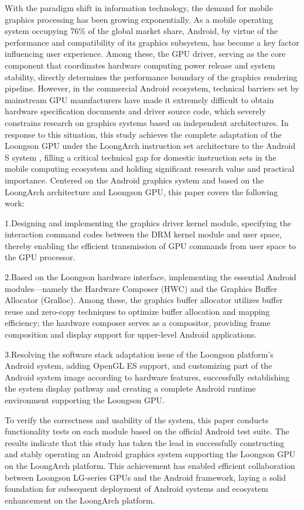 \begin{abstract*}
  With the paradigm shift in information technology, the demand for mobile graphics processing has been growing exponentially. As a mobile operating system occupying 76\% of the global market share,
  Android, by virtue of the performance and compatibility of its graphics subsystem, 
  has become a key factor influencing user experience. Among these, the GPU driver, 
  serving as the core component that coordinates hardware computing power release and system stability,
  directly determines the performance boundary of the graphics rendering pipeline. 
  However, in the commercial Android ecosystem, technical barriers set by mainstream GPU manufacturers 
  have made it extremely difficult to obtain hardware specification documents and driver source code,
  which severely constrains research on graphics systems based on independent architectures. 
  In response to this situation, this study achieves the complete adaptation of the Loongson GPU under 
  the LoongArch instruction set architecture to the Android S system
  , filling a critical technical gap for domestic instruction sets in the mobile computing ecosystem and 
  holding significant research value and practical importance. Centered on the Android graphics system and 
  based on the LoongArch architecture and Loongson GPU, this paper covers the following work:
  
  1.Designing and implementing the graphics driver kernel module, specifying the interaction command codes between 
  the DRM kernel module and user space, thereby enabling the efficient transmission of GPU commands from 
  user space to the GPU processor.
  
  2.Based on the Loongson hardware interface, implementing the essential Android modules—namely the Hardware Composer (HWC) and the Graphics Buffer Allocator (Gralloc).
  Among these, the graphics buffer allocator utilizes buffer reuse and zero-copy techniques to optimize buffer allocation and mapping efficiency;
  the hardware composer serves as a compositor, providing frame composition and display support for upper-level Android applications.
  
  3.Resolving the software stack adaptation issue of the Loongson platform’s Android system, adding OpenGL ES support, and customizing part of the Android system image according to hardware features,
  successfully establishing the system display pathway and creating a complete Android runtime environment supporting the Loongson GPU.
  
  To verify the correctness and usability of the system, this paper conducts functionality tests on each module based on the official Android test suite.
  The results indicate that this study has taken the lead in successfully constructing and stably operating an Android graphics system supporting the Loongson GPU on the LoongArch platform.
  This achievement has enabled efficient collaboration between Loongson LG-series GPUs and the Android framework, laying a solid foundation for subsequent deployment of Android systems and ecosystem enhancement on the LoongArch platform.
  
\end{abstract*}
